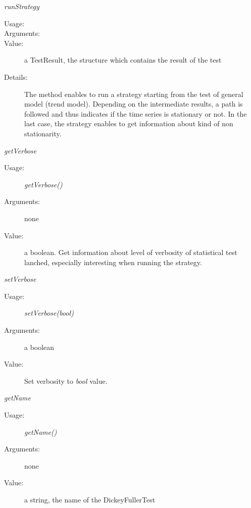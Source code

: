 \begin{description}
\begin{description}
\item \textit{runStrategy}
\begin{description}
\item[Usage:] \rule{0pt}{1em}
\item[Arguments:] \rule{0pt}{1em}
\item[Value:]  a TestResult, the structure which contains the result of the test
\item[Details:] The method enables to run a strategy starting from the test of general model (trend model). Depending on the intermediate results, a path is followed
and thus indicates if the time series is stationary or not. In the last case, the strategy enables to get information about kind of non stationarity.
\end{description}
\bigskip

\item \textit{getVerbose}
\begin{description}
\item[Usage:] \textit{getVerbose()}
\item[Arguments:] none
\item[Value:] a boolean. Get information about level of verbosity of statistical test lanched, especially interesting when running the strategy.
\end{description}
\bigskip

\item \textit{setVerbose}
\begin{description}
\item[Usage:] \textit{setVerbose(bool)}
\item[Arguments:] a boolean
\item[Value:] Set verbosity to \textit{bool} value.
\end{description}
\bigskip

\item \textit{getName}
\begin{description}
\item[Usage:] \textit{getName()}
\item[Arguments:] none
\item[Value:] a string, the name of the DickeyFullerTest
\end{description}
\bigskip


\end{description}
\end{description}
